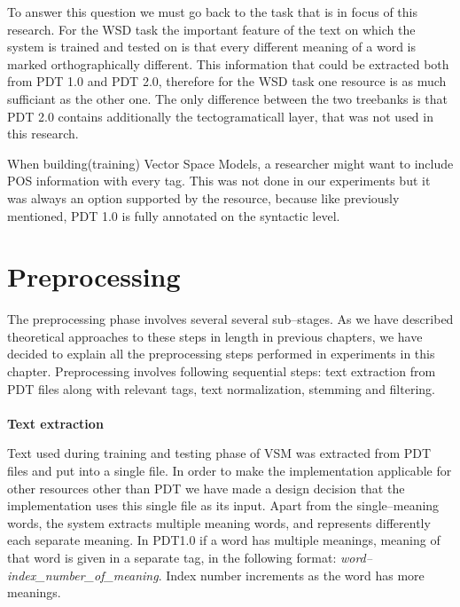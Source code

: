 To answer this question we must go back to the task that is in focus of this research. For the WSD task the 
important feature of the text on which the system is trained and tested on is that every different meaning of a 
word is marked orthographically different. This information that could be extracted both from PDT 1.0 and 
PDT 2.0, therefore for the WSD task one resource is as much sufficiant as the other one. The only 
difference between the two treebanks is that PDT 2.0 contains additionally the tectogramaticall layer, that 
was not used in this research.  

When building(training) Vector Space Models, a researcher might want to include POS information with 
every tag. This was not done in our experiments but it was always an option supported by the resource, 
because like previously mentioned, PDT 1.0 is fully annotated on the syntactic level. 

\section{Preprocessing}
The preprocessing phase involves several several sub--stages. As we have described theoretical approaches to these steps in length in previous chapters, we have decided to explain all the preprocessing steps performed in experiments in this chapter. Preprocessing involves following sequential steps: text extraction from PDT files along with relevant tags, text normalization, stemming and filtering. 
\\\\  \textbf{Text extraction}

Text used during training and testing phase of VSM was extracted from PDT files and put into a single file. 
In order to make the implementation applicable for other resources other than PDT we have made a 
design decision that the implementation uses this single file as its input. Apart from the single--meaning 
words, the system extracts multiple meaning words, and represents differently each separate meaning. In 
PDT1.0 if a word has multiple meanings, meaning of that word is given in a separate tag, in the following format: 
\textit{word--index\_number\_of\_meaning}. Index number increments as the word has more meanings.

